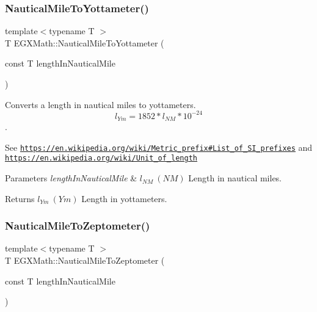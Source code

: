 \subsubsection{\texorpdfstring{Nautical\+Mile\+To\+Yottameter()}{NauticalMileToYottameter()}}
{\footnotesize\ttfamily template$<$typename T $>$ \\
T E\+G\+X\+Math\+::\+Nautical\+Mile\+To\+Yottameter (\begin{DoxyParamCaption}\item[{const T}]{length\+In\+Nautical\+Mile }\end{DoxyParamCaption})}



Converts a length in nautical miles to yottameters. \[ l_{Ym}=1852 * l_{NM} * 10^{-24} \]. 

See \href{https://en.wikipedia.org/wiki/Metric_prefix#List_of_SI_prefixes}{\tt https\+://en.\+wikipedia.\+org/wiki/\+Metric\+\_\+prefix\#\+List\+\_\+of\+\_\+\+S\+I\+\_\+prefixes} and \href{https://en.wikipedia.org/wiki/Unit_of_length}{\tt https\+://en.\+wikipedia.\+org/wiki/\+Unit\+\_\+of\+\_\+length} 
\begin{DoxyParams}{Parameters}
{\em length\+In\+Nautical\+Mile} & $ l_{NM}\ (NM)$ Length in nautical miles. \\
\hline
\end{DoxyParams}
\begin{DoxyReturn}{Returns}
$ l_{Ym}\ (Ym)$ Length in yottameters. 
\end{DoxyReturn}
\mbox{\label{group___e_g_x_math-_conversions-_length_conversions-_nautical-_nautical_mile-_s_i_ga58ac712a2ae63b010c8480d380f2a7c6}} 
\subsubsection{\texorpdfstring{Nautical\+Mile\+To\+Zeptometer()}{NauticalMileToZeptometer()}}
{\footnotesize\ttfamily template$<$typename T $>$ \\
T E\+G\+X\+Math\+::\+Nautical\+Mile\+To\+Zeptometer (\begin{DoxyParamCaption}\item[{const T}]{length\+In\+Nautical\+Mile }\end{DoxyParamCaption})}



